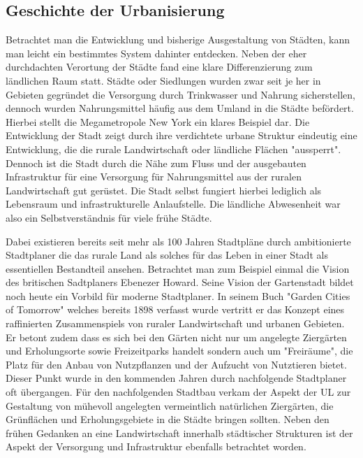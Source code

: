 \documentclass{article}
\begin{document}
\subsection{Geschichte der Urbanisierung}

Betrachtet man die Entwicklung und bisherige Ausgestaltung von Städten, kann man leicht ein bestimmtes System dahinter entdecken.
Neben der eher durchdachten Verortung der Städte fand eine klare Differenzierung zum ländlichen Raum statt. Städte oder Siedlungen wurden
zwar seit je her in Gebieten gegründet die Versorgung durch Trinkwasser und Nahrung sicherstellen, dennoch wurden Nahrungsmittel häufig
aus dem Umland in die Städte befördert. Hierbei stellt die Megametropole New York ein klares Beispiel dar. Die Entwicklung der Stadt zeigt
durch ihre verdichtete urbane Struktur eindeutig eine Entwicklung, die die rurale Landwirtschaft oder ländliche Flächen "aussperrt". Dennoch
ist die Stadt durch die Nähe zum Fluss und der ausgebauten Infrastruktur für eine Versorgung für Nahrungsmittel aus der ruralen Landwirtschaft
gut gerüstet. Die Stadt selbst fungiert hierbei lediglich als Lebensraum und infrastrukturelle Anlaufstelle.
Die ländliche Abwesenheit war also ein Selbstverständnis für viele frühe Städte.

Dabei existieren bereits seit mehr als 100 Jahren Stadtpläne durch ambitionierte Stadtplaner die das rurale Land als solches für das Leben in einer
Stadt als essentiellen Bestandteil ansehen. Betrachtet man zum Beispiel einmal die Vision des britischen Sadtplaners Ebenezer Howard. Seine Vision der
Gartenstadt bildet noch heute ein Vorbild für moderne Stadtplaner. In seinem Buch "Garden Cities of Tomorrow" welches bereits 1898 verfasst wurde vertritt er das Konzept eines raffinierten Zusammenspiels von ruraler Landwirtschaft und urbanen Gebieten. Er betont zudem dass es sich bei den
Gärten nicht nur um angelegte Ziergärten und Erholungsorte sowie Freizeitparks handelt sondern auch um "Freiräume", die Platz für den Anbau von
Nutzpflanzen und der Aufzucht von Nutztieren bietet. Dieser Punkt wurde in den kommenden Jahren durch nachfolgende Stadtplaner oft übergangen. Für den nachfolgenden Stadtbau verkam der Aspekt der UL zur Gestaltung von mühevoll angelegten vermeintlich natürlichen Ziergärten, die Grünflächen und
Erholungsgebiete in die Städte bringen sollten. Neben den frühen Gedanken an eine Landwirtschaft innerhalb städtischer Strukturen ist der Aspekt der
Versorgung und Infrastruktur ebenfalls betrachtet worden.
\end{document}
